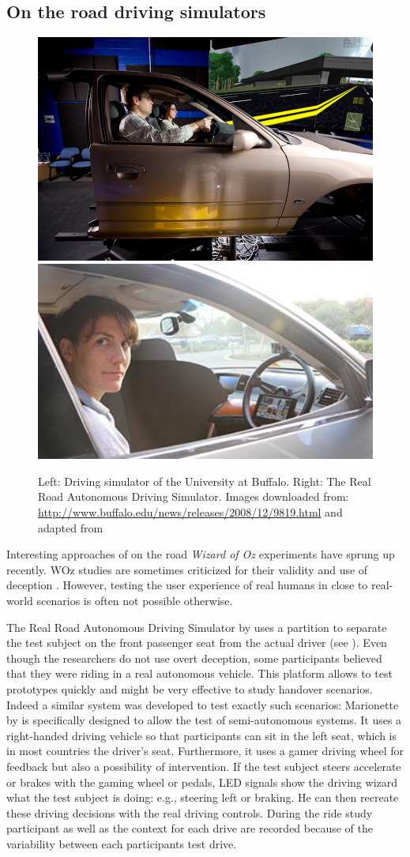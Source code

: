 \subsection{On the road driving simulators}\label{ssec:simulator}
\begin{figure}
    \includegraphics[height=0.3\textwidth]{fig/simulator}\hfill\includegraphics[height=0.3\textwidth]{fig/rrads}
    \caption[Driving simulators]{Left: Driving simulator of the University at Buffalo. 
   Right: The Real Road Autonomous Driving Simulator. Images downloaded from: \url{http://www.buffalo.edu/news/releases/2008/12/9819.html} and adapted from \citet{Baltodano2015}}
    \label{fig:simulators}
\end{figure}
Interesting approaches of on the road \emph{Wizard of Oz} experiments have sprung up recently.  WOz studies are sometimes criticized for their validity and use of deception \citep[see][]{Riek2012WizardGuidelines}. However, testing the user experience of real humans in close to real-world scenarios is often not possible otherwise. 

The Real Road Autonomous Driving Simulator by\citet{Baltodano2015} uses a partition to separate the test subject on the front passenger seat from the actual driver (see \emph{}). Even though the researchers do not use overt deception, some participants believed that they were riding in a real autonomous vehicle. This platform allows to test prototypes quickly and might be very effective to study handover scenarios. Indeed a similar system was developed to test exactly such scenarios: Marionette by \citet{Wang2017} is specifically designed to allow the test of semi-autonomous systems. It uses a right-handed driving vehicle so that participants can sit in the left seat, which is in most countries the driver's seat. Furthermore, it uses a gamer driving wheel for feedback but also a possibility of intervention. If the test subject steers accelerate or brakes with the gaming wheel or pedals, LED signals show the driving wizard what the test subject is doing: e.g., steering left or braking. He can then recreate these driving decisions with the real driving controls. During the ride study participant as well as the context for each drive are recorded because of the variability between each participants test drive. 

